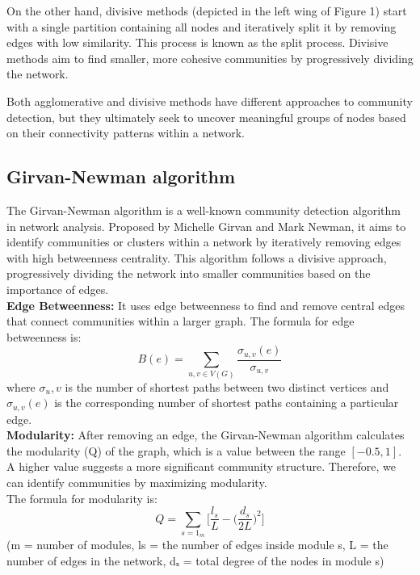 On the other hand, divisive methods (depicted in the left wing of Figure 1) start with a single partition containing all nodes and iteratively split it by removing edges with low similarity. This process is known as the split process. Divisive methods aim to find smaller, more cohesive communities by progressively dividing the network.

Both agglomerative and divisive methods have different approaches to community detection, but they ultimately seek to uncover meaningful groups of nodes based on their connectivity patterns within a network.
\subsection{Girvan-Newman algorithm}
The Girvan-Newman algorithm is a well-known community detection algorithm in network analysis. Proposed by Michelle Girvan and Mark Newman, it aims to identify communities or clusters within a network by iteratively removing edges with high betweenness centrality. This algorithm follows a divisive approach, progressively dividing the network into smaller communities based on the importance of edges.\\
\textbf{Edge Betweenness: } It uses edge betweenness to find and remove central edges that connect communities within a larger graph.
The formula for edge betweenness is: \newline
\begin{equation}
    B(e) = \sum_{u,v \in V(G)} \frac{\sigma_{u,v}(e)}{\sigma_{u,v}}
\end{equation}
where $\sigma{_u,v}$ is the number of shortest paths between two distinct vertices and $\sigma_{u,v}(e)$ is the corresponding number of shortest paths containing a particular edge.\\
\textbf{Modularity: } After removing an edge, the Girvan-Newman algorithm calculates the modularity (Q) of the graph, which is a value between the range $[-0.5,1]$. A higher value suggests a more significant community structure. Therefore, we can identify communities by maximizing modularity.\\

The formula for modularity is: 
\begin{equation}
    Q = \sum_{s=1}_m\Big[\frac{l_s}{L}-\Big(\frac{d_s}{2L}\Big)^2\Big]
\end{equation}
(m = number of modules, ls = the number of edges inside module s, L = the number of edges in the network, dₛ = total degree of the nodes in module s)\\

